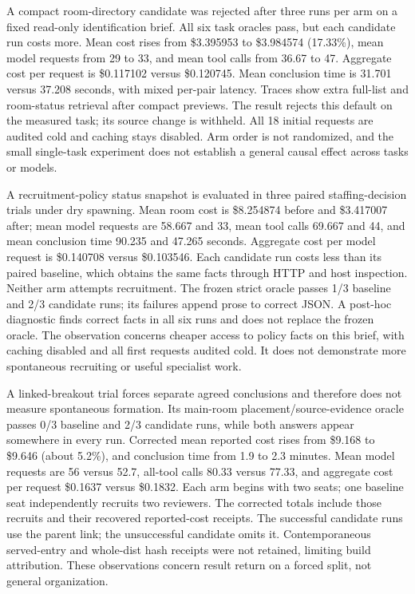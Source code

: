 A compact room-directory candidate was rejected after three runs per arm on a fixed read-only identification brief. All six task oracles pass, but each candidate run costs more. Mean cost rises from \$3.395953 to \$3.984574 (17.33\%), mean model requests from 29 to 33, and mean tool calls from 36.67 to 47. Aggregate cost per request is \$0.117102 versus \$0.120745. Mean conclusion time is 31.701 versus 37.208 seconds, with mixed per-pair latency. Traces show extra full-list and room-status retrieval after compact previews. The result rejects this default on the measured task; its source change is withheld. All 18 initial requests are audited cold and caching stays disabled. Arm order is not randomized, and the small single-task experiment does not establish a general causal effect across tasks or models.


A recruitment-policy status snapshot is evaluated in three paired staffing-decision trials under dry spawning. Mean room cost is \$8.254874 before and \$3.417007 after; mean model requests are 58.667 and 33, mean tool calls 69.667 and 44, and mean conclusion time 90.235 and 47.265 seconds. Aggregate cost per model request is \$0.140708 versus \$0.103546. Each candidate run costs less than its paired baseline, which obtains the same facts through HTTP and host inspection. Neither arm attempts recruitment. The frozen strict oracle passes 1/3 baseline and 2/3 candidate runs; its failures append prose to correct JSON. A post-hoc diagnostic finds correct facts in all six runs and does not replace the frozen oracle. The observation concerns cheaper access to policy facts on this brief, with caching disabled and all first requests audited cold. It does not demonstrate more spontaneous recruiting or useful specialist work.


A linked-breakout trial forces separate agreed conclusions and therefore does not measure spontaneous formation. Its main-room placement/source-evidence oracle passes 0/3 baseline and 2/3 candidate runs, while both answers appear somewhere in every run. Corrected mean reported cost rises from \$9.168 to \$9.646 (about 5.2\%), and conclusion time from 1.9 to 2.3 minutes. Mean model requests are 56 versus 52.7, all-tool calls 80.33 versus 77.33, and aggregate cost per request \$0.1637 versus \$0.1832. Each arm begins with two seats; one baseline seat independently recruits two reviewers. The corrected totals include those recruits and their recovered reported-cost receipts. The successful candidate runs use the parent link; the unsuccessful candidate omits it. Contemporaneous served-entry and whole-dist hash receipts were not retained, limiting build attribution. These observations concern result return on a forced split, not general organization.

